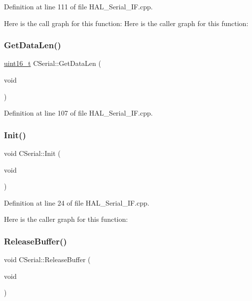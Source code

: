 Definition at line 111 of file H\+A\+L\+\_\+\+Serial\+\_\+\+I\+F.\+cpp.

Here is the call graph for this function\+:
Here is the caller graph for this function\+:
\mbox{\label{class_c_serial_a4327d6041fe9a390612b214709027cbb}} 
\subsubsection{\texorpdfstring{GetDataLen()}{GetDataLen()}}
{\footnotesize\ttfamily \mbox{\hyperlink{_a_d_a_s___types_8h_a1f1825b69244eb3ad2c7165ddc99c956}{uint16\+\_\+t}} C\+Serial\+::\+Get\+Data\+Len (\begin{DoxyParamCaption}\item[{void}]{ }\end{DoxyParamCaption})}



Definition at line 107 of file H\+A\+L\+\_\+\+Serial\+\_\+\+I\+F.\+cpp.

\mbox{\label{class_c_serial_aed500bd204c4b37665d6d228333edafb}} 
\subsubsection{\texorpdfstring{Init()}{Init()}}
{\footnotesize\ttfamily void C\+Serial\+::\+Init (\begin{DoxyParamCaption}\item[{void}]{ }\end{DoxyParamCaption})}



Definition at line 24 of file H\+A\+L\+\_\+\+Serial\+\_\+\+I\+F.\+cpp.

Here is the caller graph for this function\+:
\mbox{\label{class_c_serial_a941e5cae2ca04518925a3b32f51110a6}} 
\subsubsection{\texorpdfstring{ReleaseBuffer()}{ReleaseBuffer()}}
{\footnotesize\ttfamily void C\+Serial\+::\+Release\+Buffer (\begin{DoxyParamCaption}\item[{void}]{ }\end{DoxyParamCaption})}



